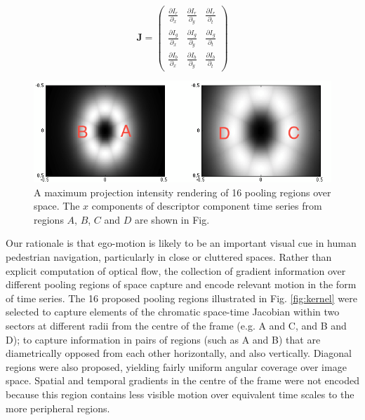 \begin{equation}
\mathbf{J} = \left (
\begin{array}{ccc}
\frac{\partial I_r}{\partial_x} & \frac{\partial I_r}{\partial_y}   & \frac{\partial I_r}{\partial_t} \\
\frac{\partial I_g}{\partial_x}   & \frac{\partial I_g}{\partial_y}  &  \frac{\partial I_g}{\partial_t} \\
\frac{\partial I_b}{\partial_x}  & \frac{\partial  I_b}{\partial_y}  &  \frac{\partial I_b}{\partial_t} 
\end{array} 
\right )
\label{eq:CJ}
\end{equation}


\begin{figure}
\centering
\includegraphics[width=\linewidth]{./gfx/Chapter04/pooling_lwcolor.png}
\caption{A maximum projection intensity rendering of 16 pooling regions over space. The $x$ components of descriptor component time series from regions $A$, $B$, $C$ and $D$ are shown in Fig.}
\label{fig:pooling4lwcolor}
\end{figure}


Our rationale is that ego-motion is likely to be an important visual cue in human pedestrian navigation, particularly in close or cluttered spaces. Rather than explicit computation of optical flow, the collection of gradient information over different pooling regions of space capture and encode relevant motion in the form of time series.  The 16 proposed pooling regions illustrated in Fig. \ref{fig:kernel} were selected to capture elements of the chromatic space-time Jacobian within two sectors at different radii from the centre of the frame (e.g. A and C, and B and D); to capture information in pairs of regions (such as A and B) that are diametrically opposed from each other horizontally, and also vertically.  Diagonal regions were also proposed, yielding fairly uniform angular coverage over image space. Spatial and temporal gradients in the centre of the frame were not encoded because this region contains less visible motion over equivalent time scales to the more peripheral regions.  


